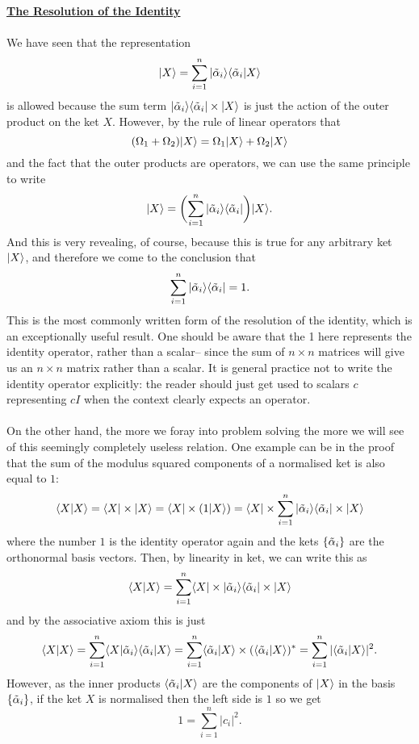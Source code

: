 \\\\
\textbf{\underline{The Resolution of the Identity}}
\\\\
We have seen that the representation
$$
\ket{X}=\northexp{X}{\talpha_{i}}
$$
is allowed because the sum term $\sop{\talpha_{i}}\times \ket{X}$ is just the action of the outer product on the ket ${X}$. However, by the rule of linear operators that 
$$
(\Omega_{1}+\Omega_{2})\ket{X}=\Omega_{1}\ket{X}+\Omega_{2}\ket{X}
$$
and the fact that the outer products are operators, we can use the same principle to write 
$$
\ket{X}=\biggl(\sum_{i=1}^{n}\sop{\talpha_{i}}\biggr)\ket{X}.
$$
And this is very revealing, of course, because this is true for any arbitrary ket $\ket{X}$, and therefore we come to the conclusion that 
$$
\sum_{i=1}^{n}\sop{\talpha_{i}}=1.
$$
This is the most commonly written form of the resolution of the identity, which is an exceptionally useful result. One should be aware that the 1 here represents the identity operator, rather than a scalar-- since the sum of $n\times n$ matrices will give us an $n\times n$ matrix rather than a scalar. It is general practice not to write the identity operator explicitly: the reader should just get used to scalars $c$ representing $cI$ when the context clearly expects an operator.
\\\\
On the other hand, the more we foray into problem solving the more we will see of this seemingly completely useless relation. One example can be in the proof that the sum of the modulus squared components of a normalised ket is also equal to $1$:
$$
\sip{X}=\bra{X}\times\ket{X}=\bra{X}\times (1\ket{X})=\bra{X}\times \sum_{i=1}^{n}\sop{\talpha_{i}}\times\ket{X}
$$
where the number $1$ is the identity operator again and the kets $\setof{\talpha_{i}}$ are the orthonormal basis vectors. Then, by linearity in ket, we can write this as 
$$
\sip{X}=\sum_{i=1}^{n}\bra{X}\times\sop{\talpha_{i}}\times\ket{X}
$$
and by the associative axiom this is just
$$
\sip{X}=\sum_{i=1}^{n}\ip{X}{\talpha_{i}}\ip{\talpha_{i}}{X}=\sum_{i=1}^{n}\ip{\talpha_{i}}{X}\times(\ip{\talpha_{i}}{X})^{\ast}=\sum_{i=1}^{n}|\ip{\talpha_{i}}{X}|^{2}.
$$
However, as the inner products $\ip{\talpha_{i}}{X}$ are the components of $\ket{X}$ in the basis $\setof{\talpha_{i}}$,  if the ket $X$ is normalised then the left side is $1$ so we get 
$$
1=\sum_{i=1}^{n}|c_{i}|^2.
$$
